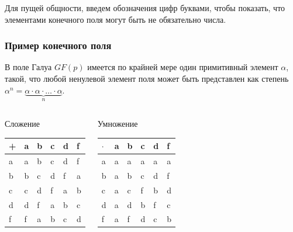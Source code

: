 Для пущей общности, введем обозначения цифр буквами, чтобы показать, что элементами конечного поля могут быть не обязательно числа.


\begin{frame}
    \frametitle{Пример конечного поля}
    
    В поле Галуа $GF(p)$ имеется по крайней мере один \alert{примитивный} элемент $\alpha$, такой, что любой \alert{ненулевой} элемент \alert{поля} может быть представлен как степень $\alpha^n=\underbrace{\alpha\cdot\alpha\cdot\ldots\cdot\alpha}_n$.
    
    \begin{columns}
        \begin{block}{Сложение}
            \begin{table}[ht]
                \label{t:fieldAdd}
                \centering
                \begin{tabular}[c]{|l||l|l|l|l|l|}
                        \hline
                        +& a& b& c& d& f\\ \hline\hline
                        a& a& b& c& d& f\\ \hline
                        b& b& c& d& f& a\\ \hline
                        c& c& d& f& a& b\\ \hline
                        d& d& f& a& b& c\\ \hline
                        f& f& a& b& c& d\\ \hline
                \end{tabular}
            \end{table}
        \end{block}
        
        \begin{block}{Умножение}
            \begin{table}[ht]
                \label{t:fieldMul}
                \centering
                \begin{tabular}[c]{|l||l|l|l|l|l|}
                    \hline
                    $\cdot$ & a& b& c& d& f\\ \hline\hline
                    a       & a& a& a& a& a\\ \hline
                    b       & a& b& c& d& f\\ \hline
                    c       & a& c& f& b& d\\ \hline
                    d       & a& d& b& f& c\\ \hline
                    f       & a& f& d& c& b\\ \hline
                \end{tabular}
            \end{table}
        \end{block}
    \end{columns}
    
     
\end{frame}



